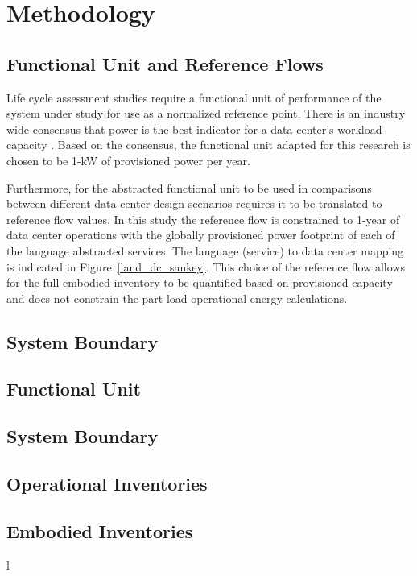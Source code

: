 \section{Methodology}
    \subsection{Functional Unit and Reference Flows}
    Life cycle assessment studies require a functional unit of performance of the system under study for use as a normalized reference point. There is an industry wide consensus that power is the best indicator for a data center's workload capacity \cite{shah11, whitehead15, barroso18}. Based on the consensus, the functional unit adapted for this research is chosen to be 1-kW of provisioned power per year. 
    
    Furthermore, for the abstracted functional unit to be used in comparisons between different data center design scenarios requires it to be translated to reference flow values. In this study the reference flow is constrained to 1-year of data center operations with the globally provisioned power footprint of each of the language abstracted services. The language (service) to data center mapping is indicated in Figure~\ref{land_dc_sankey}. This choice of the reference flow allows for the full embodied inventory to be quantified based on provisioned capacity and does not constrain the part-load operational energy calculations. 
    
    
    
    \subsection{System Boundary}
    
    
    \subsection{Functional Unit}
    \subsection{System Boundary}
    \subsection{Operational Inventories}
    \subsection{Embodied Inventories}
    l
